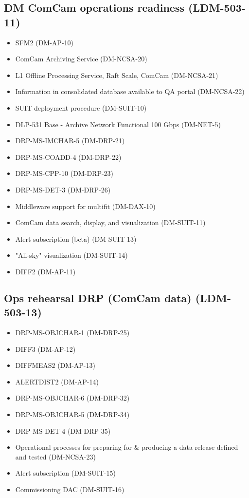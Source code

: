 \subsection{DM ComCam operations readiness \textbf{(LDM-503-11)}\label{LDM-503-11}}
\begin{itemize}
\item SFM2		(DM-AP-10)
\item ComCam Archiving Service		(DM-NCSA-20)
\item L1 Offline Processing Service, Raft Scale, ComCam		(DM-NCSA-21)
\item Information in consolidated database available to QA portal		(DM-NCSA-22)
\item SUIT deployment procedure		(DM-SUIT-10)
\item DLP-531 Base - Archive Network Functional 100 Gbps		(DM-NET-5)
\item DRP-MS-IMCHAR-5		(DM-DRP-21)
\item DRP-MS-COADD-4		(DM-DRP-22)
\item DRP-MS-CPP-10		(DM-DRP-23)
\item DRP-MS-DET-3		(DM-DRP-26)
\item Middleware support for multifit		(DM-DAX-10)
\item ComCam data search, display, and visualization		(DM-SUIT-11)
\item Alert subscription (beta)		(DM-SUIT-13)
\item "All-sky" visualization		(DM-SUIT-14)
\item DIFF2		(DM-AP-11)
\end{itemize}
\subsection{Ops rehearsal DRP (ComCam data) \textbf{(LDM-503-13)}\label{LDM-503-13}}
\begin{itemize}
\item DRP-MS-OBJCHAR-1		(DM-DRP-25)
\item DIFF3		(DM-AP-12)
\item DIFFMEAS2		(DM-AP-13)
\item ALERTDIST2		(DM-AP-14)
\item DRP-MS-OBJCHAR-6		(DM-DRP-32)
\item DRP-MS-OBJCHAR-5		(DM-DRP-34)
\item DRP-MS-DET-4		(DM-DRP-35)
\item Operational processes for preparing for \& producing a data release defined and tested		(DM-NCSA-23)
\item Alert subscription		(DM-SUIT-15)
\item Commissioning DAC		(DM-SUIT-16)
\end{itemize}
